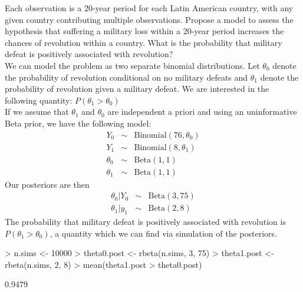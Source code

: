 \documentclass[10pt,a4paper]{article}
\newcommand{\red}{\color{red}}
\newcommand{\black}{\color{black}}
\begin{document}
\begin{enumerate}
Each observation is a 20-year period for each Latin American country, with any given country contributing multiple observations.  Propose a model to assess the hypothesis that suffering a military loss within a 20-year period increases the chances of revolution within a country.  What is the probability that military defeat is positively associated with revolution? \\

\medskip \red
We can model the problem as two separate binomial distributions.  Let $\theta_0$ denote the probability of revolution conditional on no military defeats and $\theta_1$ denote the probability of revolution given a military defeat.  We are interested in the following quantity: $P(\theta_1 > \theta_0)$ \\

If we assume that $\theta_1$ and $\theta_0$ are independent a priori and using an uninformative Beta prior, we have the following model:
\begin{eqnarray*}
Y_0 &\sim& \mathrm{Binomial}(76, \theta_0) \\
Y_1 &\sim& \mathrm{Binomial}(8, \theta_1)\\
\theta_0 &\sim& \mathrm{Beta}(1,1) \\
\theta_1 &\sim& \mathrm{Beta}(1,1)
\end{eqnarray*} 
Our posteriors are then
\begin{eqnarray*}
\theta_0 | Y_0 &\sim& \mathrm{Beta}(3,75)\\
\theta_1 | y_1 &\sim& \mathrm{Beta}(2,8)
\end{eqnarray*}
The probability that military defeat is positively associated with revolution is $P(\theta_1 > \theta_0)$, a quantity which we can find via simulation of the posteriors. \\
\medskip
\small
\begin{Schunk}
\begin{Sinput}
> n.sims <- 10000
> theta0.post <- rbeta(n.sims, 3, 75)
> theta1.post <- rbeta(n.sims, 2, 8)
> mean(theta1.post > theta0.post)
\end{Sinput}
\begin{Soutput}
[1] 0.9479
\end{Soutput}
\end{Schunk}
\black

\end{enumerate}
\end{document}
